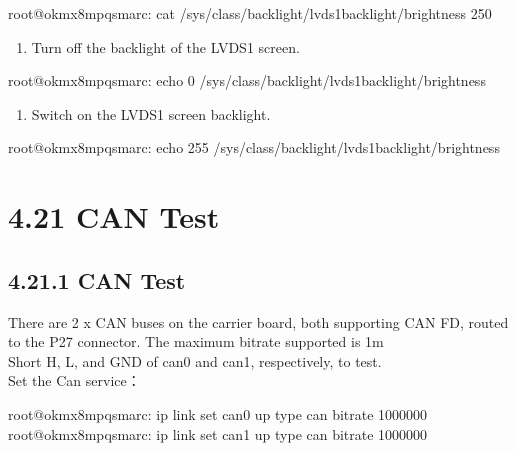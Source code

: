 \documentclass[letterpaper,10pt,openany,english]{sphinxmanual}
\begin{document}
\begin{sphinxVerbatim}[commandchars=\\\{\}]
root@ok\PYGZhy{}mx8mpq\PYGZhy{}smarc:\PYGZti{}\PYGZsh{} cat /sys/class/backlight/lvds1\PYGZus{}backlight/brightness
250
\end{sphinxVerbatim}
\begin{enumerate}
%
\setcounter{enumi}{1}
\item {} 
\sphinxAtStartPar
Turn off the backlight of the LVDS1 screen.

\end{enumerate}

\begin{sphinxVerbatim}[commandchars=\\\{\}]
root@ok\PYGZhy{}mx8mpq\PYGZhy{}smarc:\PYGZti{}\PYGZsh{} echo 0 \PYGZgt{} /sys/class/backlight/lvds1\PYGZus{}backlight/brightness
\end{sphinxVerbatim}
\begin{enumerate}
%
\setcounter{enumi}{2}
\item {} 
\sphinxAtStartPar
Switch on the LVDS1 screen backlight.

\end{enumerate}

\begin{sphinxVerbatim}[commandchars=\\\{\}]
root@ok\PYGZhy{}mx8mpq\PYGZhy{}smarc:\PYGZti{}\PYGZsh{} echo 255 \PYGZgt{} /sys/class/backlight/lvds1\PYGZus{}backlight/brightness
\end{sphinxVerbatim}


\section{4.21 CAN Test}
\label{\detokenize{linux-manual:can-test}}

\subsection{4.21.1 CAN Test}
\label{\detokenize{linux-manual:id6}}
\sphinxAtStartPar
There are 2 x CAN buses on the carrier board, both supporting CAN FD, routed to the P27 connector. The maximum bitrate supported is 1m\\
Short H, L, and GND of can0 and can1, respectively, to test.\\
Set the Can service：

\begin{sphinxVerbatim}[commandchars=\\\{\}]
root@ok\PYGZhy{}mx8mpq\PYGZhy{}smarc:\PYGZti{}\PYGZsh{} ip link set can0 up type can bitrate 1000000
root@ok\PYGZhy{}mx8mpq\PYGZhy{}smarc:\PYGZti{}\PYGZsh{} ip link set can1 up type can bitrate 1000000
\end{sphinxVerbatim}
\end{document}
